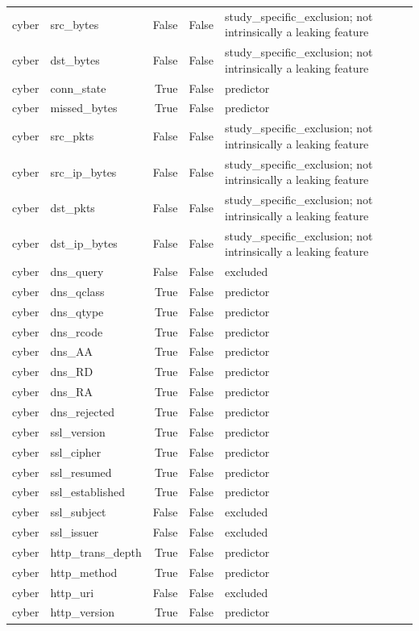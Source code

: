 \begin{table}[t]
{\begin{tabular}{llrrl}
cyber & src\_bytes & False & False & study\_specific\_exclusion; not intrinsically a leaking feature \\
cyber & dst\_bytes & False & False & study\_specific\_exclusion; not intrinsically a leaking feature \\
cyber & conn\_state & True & False & predictor \\
cyber & missed\_bytes & True & False & predictor \\
cyber & src\_pkts & False & False & study\_specific\_exclusion; not intrinsically a leaking feature \\
cyber & src\_ip\_bytes & False & False & study\_specific\_exclusion; not intrinsically a leaking feature \\
cyber & dst\_pkts & False & False & study\_specific\_exclusion; not intrinsically a leaking feature \\
cyber & dst\_ip\_bytes & False & False & study\_specific\_exclusion; not intrinsically a leaking feature \\
cyber & dns\_query & False & False & excluded \\
cyber & dns\_qclass & True & False & predictor \\
cyber & dns\_qtype & True & False & predictor \\
cyber & dns\_rcode & True & False & predictor \\
cyber & dns\_AA & True & False & predictor \\
cyber & dns\_RD & True & False & predictor \\
cyber & dns\_RA & True & False & predictor \\
cyber & dns\_rejected & True & False & predictor \\
cyber & ssl\_version & True & False & predictor \\
cyber & ssl\_cipher & True & False & predictor \\
cyber & ssl\_resumed & True & False & predictor \\
cyber & ssl\_established & True & False & predictor \\
cyber & ssl\_subject & False & False & excluded \\
cyber & ssl\_issuer & False & False & excluded \\
cyber & http\_trans\_depth & True & False & predictor \\
cyber & http\_method & True & False & predictor \\
cyber & http\_uri & False & False & excluded \\
cyber & http\_version & True & False & predictor \\

\end{tabular}}
\end{table}
